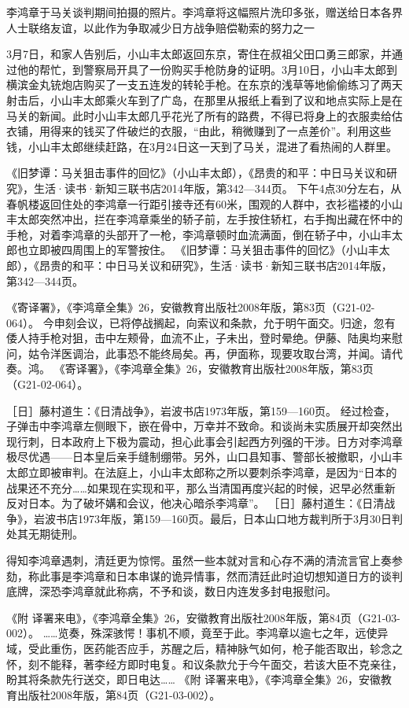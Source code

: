 \documentclass[12pt,UTF8]{ctexbook}
\begin{document}
李鸿章于马关谈判期间拍摄的照片。李鸿章将这幅照片洗印多张，赠送给日本各界人士联络友谊，以此作为争取减少日方战争赔偿勒索的努力之一

3月7日，和家人告别后，小山丰太郎返回东京，寄住在叔祖父田口勇三郎家，并通过他的帮忙，到警察局开具了一份购买手枪防身的证明。3月10日，小山丰太郎到横滨金丸铳炮店购买了一支五连发的转轮手枪。在东京的浅草等地偷偷练习了两天射击后，小山丰太郎乘火车到了广岛，在那里从报纸上看到了议和地点实际上是在马关的新闻。此时小山丰太郎几乎花光了所有的路费，不得已将身上的衣服卖给估衣铺，用得来的钱买了件破烂的衣服，“由此，稍微赚到了一点差价”。利用这些钱，小山丰太郎继续赶路，在3月24日这一天到了马关，混进了看热闹的人群里。

《旧梦谭：马关狙击事件的回忆》（小山丰太郎），《昂贵的和平：中日马关议和研究》，生活·读书·新知三联书店2014年版，第342—344页。
下午4点30分左右，从春帆楼返回住处的李鸿章一行距引接寺还有60米，围观的人群中，衣衫褴褛的小山丰太郎突然冲出，拦在李鸿章乘坐的轿子前，左手按住轿杠，右手掏出藏在怀中的手枪，对着李鸿章的头部开了一枪，李鸿章顿时血流满面，倒在轿子中，小山丰太郎也立即被四周围上的军警按住。 《旧梦谭：马关狙击事件的回忆》（小山丰太郎），《昂贵的和平：中日马关议和研究》，生活·读书·新知三联书店2014年版，第342—344页。

《寄译署》，《李鸿章全集》26，安徽教育出版社2008年版，第83页（G21-02-064）。
今申刻会议，已将停战搁起，向索议和条款，允于明午面交。归途，忽有倭人持手枪对狙，击中左颊骨，血流不止，子未出，登时晕绝。伊藤、陆奥均来慰问，姑令洋医调治，此事恐不能终局矣。再，伊面称，现要攻取台湾，并闻。请代奏。鸿。 《寄译署》，《李鸿章全集》26，安徽教育出版社2008年版，第83页（G21-02-064）。

［日］藤村道生：《日清战争》，岩波书店1973年版，第159—160页。
经过检查，子弹击中李鸿章左侧眼下，嵌在骨中，万幸并不致命。和谈尚未实质展开却突然出现行刺，日本政府上下极为震动，担心此事会引起西方列强的干涉。日方对李鸿章极尽优遇——日本皇后亲手缝制绷带。另外，山口县知事、警部长被撤职，小山丰太郎立即被审判。在法庭上，小山丰太郎称之所以要刺杀李鸿章，是因为“日本的战果还不充分……如果现在实现和平，那么当清国再度兴起的时候，迟早必然重新反对日本。为了破坏媾和会议，他决心暗杀李鸿章”。 ［日］藤村道生：《日清战争》，岩波书店1973年版，第159—160页。最后，日本山口地方裁判所于3月30日判处其无期徒刑。

得知李鸿章遇刺，清廷更为惊愕。虽然一些本就对言和心存不满的清流言官上奏参劾，称此事是李鸿章和日本串谋的诡异情事，然而清廷此时迫切想知道日方的谈判底牌，深恐李鸿章就此称病，不予和谈，数日内连发多封电报慰问。

《附 译署来电》，《李鸿章全集》26，安徽教育出版社2008年版，第84页（G21-03-002）。
……览奏，殊深骇愕！事机不顺，竟至于此。李鸿章以逾七之年，远使异域，受此重伤，医药能否应手，苏醒之后，精神脉气如何，枪子能否取出，轸念之怀，刻不能释，著李经方即时电复。和议条款允于今午面交，若该大臣不克亲往，盼其将条款先行送交，即日电达…… 《附 译署来电》，《李鸿章全集》26，安徽教育出版社2008年版，第84页（G21-03-002）。
\end{document}
